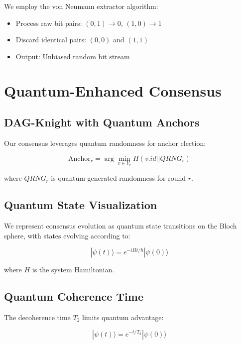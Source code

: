 \documentclass[11pt,a4paper]{article}
\begin{document}
We employ the von Neumann extractor algorithm:
\begin{itemize}
    \item Process raw bit pairs: $(0,1) \rightarrow 0$, $(1,0) \rightarrow 1$
    \item Discard identical pairs: $(0,0)$ and $(1,1)$
    \item Output: Unbiased random bit stream
\end{itemize}

\section{Quantum-Enhanced Consensus}

\subsection{DAG-Knight with Quantum Anchors}

Our consensus leverages quantum randomness for anchor election:

\begin{equation}
\text{Anchor}_r = \arg\min_{v \in V_r} H(v.id || QRNG_r)
\end{equation}

where $QRNG_r$ is quantum-generated randomness for round $r$.

\subsection{Quantum State Visualization}

We represent consensus evolution as quantum state transitions on the Bloch sphere, with states evolving according to:

\begin{equation}
|\psi(t)\rangle = e^{-iHt/\hbar}|\psi(0)\rangle
\end{equation}

where $H$ is the system Hamiltonian.

\subsection{Quantum Coherence Time}

The decoherence time $T_2$ limits quantum advantage:

\begin{equation}
|\psi(t)\rangle = e^{-t/T_2}|\psi(0)\rangle
\end{equation}
\end{document}
